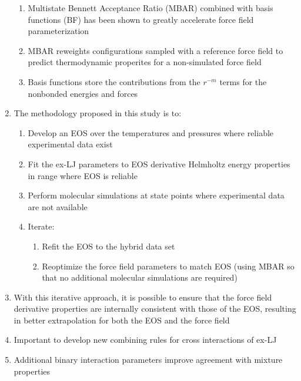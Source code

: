 \documentclass[11pt,a4paper]{article}
\begin{document}
\begin{enumerate}
\begin{enumerate}
		\item Multistate Bennett Acceptance Ratio (MBAR) combined with basis functions (BF) has been shown to greatly accelerate force field parameterization
		\item MBAR reweights configurations sampled with a reference force field to predict thermodynamic properites for a non-simulated force field
		\item Basis functions store the contributions from the $r^{-m}$ terms for the nonbonded energies and forces
	\end{enumerate}
	\item The methodology proposed in this study is to:
	\begin{enumerate}
		\item Develop an EOS over the temperatures and pressures where reliable experimental data exist
		\item Fit the ex-LJ parameters to EOS derivative Helmholtz energy properties in range where EOS is reliable
		\item Perform molecular simulations at state points where experimental data are not available
		\item Iterate:
		\begin{enumerate}
			\item Refit the EOS to the hybrid data set
			\item Reoptimize the force field parameters to match EOS (using MBAR so that no additional molecular simulations are required)
		\end{enumerate}
	\end{enumerate}
	\item With this iterative approach, it is possible to ensure that the force field derivative properties are internally consistent with those of the EOS, resulting in better extrapolation for both the EOS and the force field
    \item Important to develop new combining rules for cross interactions of ex-LJ
    \item Additional binary interaction parameters improve agreement with mixture properties
\end{enumerate}
\end{document}
